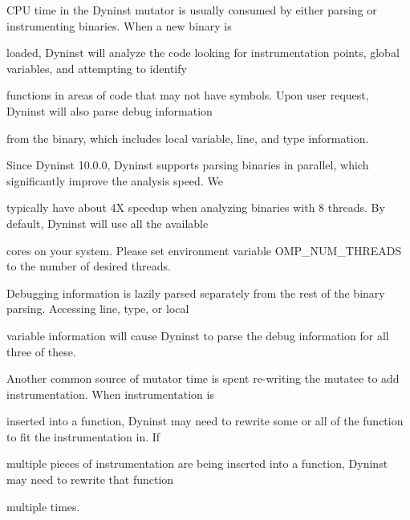 {

CPU time in the Dyninst mutator is usually consumed by either parsing or instrumenting binaries. When a new binary is

loaded, Dyninst will analyze the code looking for instrumentation points, global variables, and attempting to identify

functions in areas of code that may not have symbols. Upon user request, Dyninst will also parse debug information

from the binary, which includes local variable, line, and type information.





\bigskip



{

Since Dyninst 10.0.0, Dyninst supports parsing binaries in parallel, which significantly improve the analysis speed. We

typically have about 4X speedup when analyzing binaries with 8 threads. By default, Dyninst will use all the available

cores on your system. Please set environment variable OMP_NUM_THREADS to the number of desired threads.





\bigskip



{

Debugging information is lazily parsed separately from the rest of the binary parsing. Accessing line, type, or local

variable information will cause Dyninst to parse the debug information for all three of these.}





\bigskip



{

Another common source of mutator time is spent re-writing the mutatee to add instrumentation. When instrumentation is

inserted into a function, Dyninst may need to rewrite some or all of the function to fit the instrumentation in. If

multiple pieces of instrumentation are being inserted into a function, Dyninst may need to rewrite that function

multiple times.}





}}
